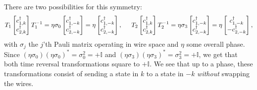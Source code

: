 There are two possibilities for this symmetry: 
\begin{equation}
T_1 \begin{bmatrix} c^\dagger_{1,k} \\ c^\dagger_{2,k} \end{bmatrix} T_1^{-1} = \eta\sigma_0 \begin{bmatrix} c^\dagger_{1,-k} \\ c^\dagger_{2,-k} \end{bmatrix} = \eta\begin{bmatrix} c^\dagger_{1,-k} \\ c^\dagger_{2,-k} \end{bmatrix}, \hspace{0.5cm} T_2 \begin{bmatrix} c^\dagger_{1,k} \\ c^\dagger_{2,k} \end{bmatrix} T_2^{-1} = \eta\sigma_3 \begin{bmatrix} c^\dagger_{1,-k} \\ c^\dagger_{2,-k} \end{bmatrix} = \eta\begin{bmatrix} c^\dagger_{1,-k} \\  - c^\dagger_{2,-k} \end{bmatrix}, \nonumber
\end{equation} 
with $\sigma_j$ the $j$'th Pauli matrix operating in wire space and $\eta$ some overall phase. Since $(\eta\sigma_0)(\eta\sigma_0)^* = \sigma_0^2 = + \mathbb{I}$ and $(\eta\sigma_3)(\eta\sigma_3)^* = \sigma_3^2 = + \mathbb{I}$, we get that both time reversal transformations square to $+\mathbb{I}$. We see that up to a phase, these transformations consist of sending a state in $k$ to a state in $-k$ \textit{without} swapping the wires. 

